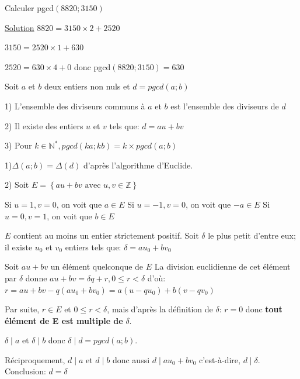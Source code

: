 \documentclass[french]{book}
\begin{document}
\begin{exemple}

Calculer pgcd$(8820;3150)$

\underline{Solution}
$8820=3150\times 2+2520$

$3150=2520\times 1+630$

$2520=630\times 4+0$ 
donc pgcd$(8820;3150)=630$

\end{exemple}

\begin{prop}

Soit $a$ et $b$ deux entiers non nuls et $d= pgcd(a;b)$

1) L'ensemble des diviseurs communs à $a$ et $b$ est l'ensemble des diviseurs de $d$

2) Il existe des entiers $u$ et $v$ tels que: $d=au+bv$

3) Pour  $k \in\mathbb{N}^{*}, pgcd(ka;kb)=k\times pgcd(a;b)$

\end{prop}

\begin{demo}

1)$\Delta(a;b)=\Delta(d)$ d'après l'algorithme d'Euclide.

2) Soit $E=\left\lbrace au+bv \text{ avec } u,v\in \mathbb{Z}\right\rbrace $

Si $u=1,v=0$, on voit que $a\in E$
Si $u=-1,v=0$, on voit que $-a\in E$
Si $u=0,v=1$, on voit que $b\in E$

$E$ contient au moins un entier strictement positif. Soit $\delta$ le plus petit d'entre eux;
il existe $u_{0}$ et $v_{0}$ entiers tels que: $\delta=au_{0}+bv_{0}$

Soit $au+bv$ un élément quelconque de $E$ La division euclidienne de cet élément par $\delta$ donne
  $au+bv=\delta q+r, 0 \leq r < \delta $ d'où: $r=au+bv-q \left(au_{0}+bv_{0}\right)=a \left( u-qu_{0}\right) +b\left( v-qv_{0}\right) $
 
 
 
 Par suite, $r\in E$ et $0 \leq r < \delta$, mais d'après la définition de $\delta$: $r=0$ donc \textbf{tout élément de E est multiple de } $\delta$.
 
 $\delta\mid a$ et $\delta\mid b$ donc $\delta\mid d=pgcd(a;b)$.
 
 Réciproquement, $d\mid a$ et $d\mid b$ donc aussi $d\mid au_{0}+bv_{0}$ c'est-à-dire, $d\mid\delta$. Conclusion: $d=\delta$
 
 
\end{demo}
\end{document}
